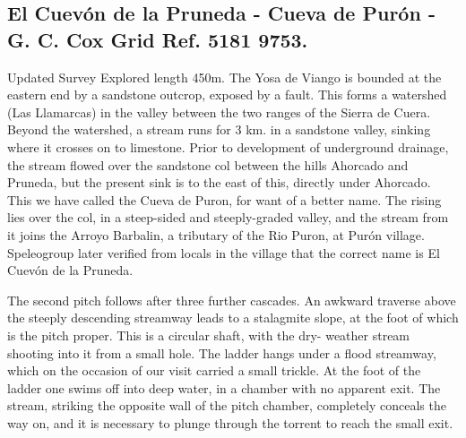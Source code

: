 \documentclass[11pt, a4paper, twoside]{memoir}
\begin{document}
\subsection*{El Cuevón de la Pruneda - Cueva de Purón - G. C. Cox Grid Ref. 5181 9753.}

Updated Survey Explored length 450m. The Yosa de Viango is bounded at the eastern end by a sandstone outcrop, exposed by a fault. This forms a watershed (Las Llamarcas) in the valley between the two ranges of the Sierra de Cuera. Beyond the watershed, a stream runs for 3 km. in a sandstone valley, sinking where it crosses on to limestone. Prior to development of underground drainage, the stream flowed over the sandstone col between the hills Ahorcado and Pruneda, but the present sink is to the east of this, directly under Ahorcado. This we have called the Cueva de Puron, for want of a better name. The rising lies over the col, in a steep-sided and steeply-graded valley, and the stream from it joins the Arroyo Barbalin, a tributary of the Rio Puron, at Purón village. Speleogroup later verified from locals in the village that the correct name is El Cuevón de la Pruneda.


The second pitch follows after three further cascades. An awkward traverse above the steeply descending streamway leads to a stalagmite slope, at the foot of which is the pitch proper. This is a circular shaft, with the dry- weather stream shooting into it from a small hole. The ladder hangs under a flood streamway, which on the occasion of our visit carried a small trickle. At the foot of the ladder one swims off into deep water, in a chamber with no apparent exit. The stream, striking the opposite wall of the pitch chamber, completely conceals the way on, and it is necessary to plunge through the torrent to reach the small exit.
\end{document}
